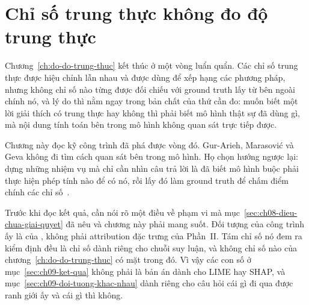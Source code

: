%
\chapter{Chỉ số trung thực không đo độ trung thực}
\label{ch:chi-so-khong-do-do-trung-thuc}

Chương~\ref{ch:do-do-trung-thuc} kết thúc ở một vòng luẩn quẩn. Các chỉ số
trung thực được hiệu chỉnh lẫn nhau và được dùng để xếp hạng các phương pháp,
nhưng không chỉ số nào từng được đối chiếu với ground truth lấy từ bên ngoài
chính nó, và lý do thì nằm ngay trong bản chất của thứ cần đo: muốn biết một
lời giải thích có trung thực hay không thì phải biết mô hình thật sự đã dùng
gì, mà nội dung tính toán bên trong mô hình không quan sát trực tiếp được.

Chương này đọc kỹ công trình đã phá được vòng đó. Gur-Arieh, Marasović và Geva
không đi tìm cách quan sát bên trong mô hình. Họ chọn hướng ngược lại: dựng
những nhiệm vụ mà chỉ cần nhìn câu trả lời là đã biết mô hình buộc phải thực
hiện phép tính nào để có nó, rồi lấy đó làm ground truth để chấm điểm chính
các chỉ số~\autocite{p21metrics}.

Trước khi đọc kết quả, cần nói rõ một điều về phạm vi mà
mục~\ref{sec:ch08-dieu-chua-giai-quyet} đã nêu và chương này phải mang suốt.
Đối tượng của công trình ấy là  của
, không
phải attribution đặc trưng của Phần~II. Tám chỉ số nó đem ra kiểm định đều là
chỉ số dành riêng cho chuỗi suy luận, và không chỉ số nào của
chương~\ref{ch:do-do-trung-thuc} có mặt trong đó. Vì vậy các con số ở
mục~\ref{sec:ch09-ket-qua} không phải là bản án dành cho LIME hay SHAP, và
mục~\ref{sec:ch09-doi-tuong-khac-nhau} dành riêng cho câu hỏi cái gì đi qua
được ranh giới ấy và cái gì thì không.










